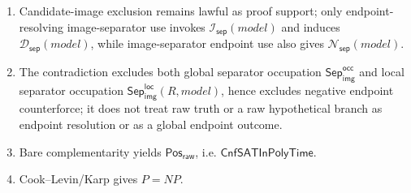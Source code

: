 \documentclass[11pt]{article}
\theoremstyle{definition}
\theoremstyle{remark}
\newcommand{\PosRaw}{\mathsf{Pos}_{\mathsf{raw}}}
\newcommand{\SepImgOcc}{\mathsf{Sep}_{\mathsf{img}}^{\mathsf{occ}}}
\newcommand{\LocalSepImgOcc}{\mathsf{Sep}_{\mathsf{img}}^{\mathsf{loc}}}
\newcommand{\CnfSATP}{\mathsf{CnfSATInPolyTime}}
\newcommand{\SepIndBridge}{\mathcal{I}_{\mathsf{sep}}}
\newcommand{\SepDisc}{\mathcal{D}_{\mathsf{sep}}}
\newcommand{\NoSepDisc}{\mathcal{N}_{\mathsf{sep}}}
\begin{document}
\begin{enumerate}
\item Candidate-image exclusion remains lawful as proof support; only endpoint-resolving image-separator use invokes \(\SepIndBridge(model)\) and induces \(\SepDisc(model)\), while image-separator endpoint use also gives \(\NoSepDisc(model)\).
\item The contradiction excludes both global separator occupation \(\SepImgOcc\) and local separator occupation \(\LocalSepImgOcc(R,model)\), hence excludes negative endpoint counterforce; it does not treat raw truth or a raw hypothetical branch as endpoint resolution or as a global endpoint outcome.
\item Bare complementarity yields \(\PosRaw\), i.e. \(\CnfSATP\).
\item Cook--Levin/Karp gives \(P=NP\).
\end{enumerate}
\end{document}
